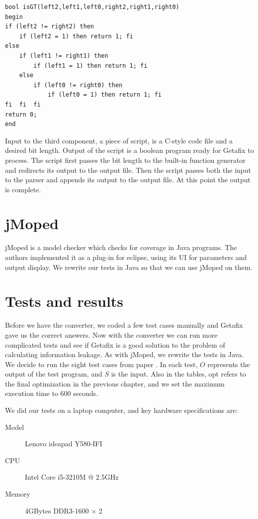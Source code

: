 \lstset{language=C}  
\begin{lstlisting}[float=h, caption={Greater than operator as a function in boolean program with bit length of 2.},label=lst:isGT]
bool isGT(left2,left1,left0,right2,right1,right0)
begin
if (left2 != right2) then
	if (left2 = 1) then return 1; fi
else 
	if (left1 != right1) then
		if (left1 = 1) then	return 1; fi
	else 
		if (left0 != right0) then
			if (left0 = 1) then	return 1; fi
fi	fi	fi
return 0;
end
\end{lstlisting}

Input to the third component, a piece of script, is a C-style code file and a desired bit length. Output of the script is a boolean program ready for Getafix to process. The script first passes the bit length to the built-in function generator and redirects its output to the output file. Then the script passes both the input to the parser and appends its output to the output file. At this point the output is complete.

\section {jMoped}
jMoped is a model checker which checks for coverage in Java programs. The authors implemented it as a plug-in for eclipse, using its UI for parameters and output display. We rewrite our tests in Java so that we can use jMoped on them.

\section{Tests and results}
Before we have the converter, we coded a few test cases manually and Getafix gave us the correct answers. Now with the converter we can run more complicated tests and see if Getafix is a good solution to the problem of calculating information leakage. As with jMoped, we rewrite the tests in Java. We decide to run the eight test cases from paper \cite{Plas11}. In each test, $O$ represents the output of the test program, and $S$ is the input. Also in the tables, opt refers to the final optimization in the previous chapter, and we set the maximum execution time to 600 seconds. 

We did our tests on a laptop computer, and key hardware specifications are:
\begin{description}
  \item[Model] Lenovo ideapad Y580-IFI
  \item[CPU] Intel Core i5-3210M @ 2.5GHz
  \item[Memory] 4GBytes DDR3-1600 $\times$ 2
\end{description}


